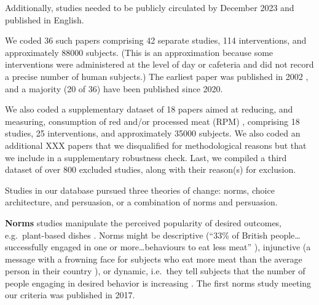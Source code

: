 \documentclass[sn-nature,pdflatex]{sn-jnl}
\begin{document}
Additionally, studies needed to be publicly circulated by December 2023
and published in English.

We coded 36 such papers
\citep{aldoh2023, allen2002, alblas2023, coker2022, griesoph2021, piester2020, sparkman2017, sparkman2020, andersson2021, kanchanachitra2020, bochmann2017, bschaden2020, cooney2016, feltz2022, haile2021, mathur2021effectiveness, peacock2017, polanco2022, sparkman2021, abrahamse2007, acharya2004, banerjee2019, berndsen2005, bertolaso2015, bianchi2022, fehrenbach2015, hatami2018, jalil2023, merrill2009, norris2014, shreedhar2021, weingarten2022, carfora2023, hennessy2016, mattson2020}
comprising 42 separate studies, 114 interventions, and approximately
88000 subjects. (This is an approximation because some interventions
were administered at the level of day or cafeteria and did not record a
precise number of human subjects.) The earliest paper was published in
2002 \citep{allen2002}, and a majority (20 of 36) have been published
since 2020.

We also coded a supplementary dataset of 18 papers aimed at reducing,
and measuring, consumption of red and/or processed meat (RPM)
\citep{carfora2017correlational, carfora2017randomised, carfora2019, carfora2019informational, delichatsios2001, dijkstra2022, emmons2005cancer, emmons2005project, jaacks2014, james2015, lee2018, perino2022, schatzkin2000, sorensen2005},
comprising 18 studies, 25 interventions, and approximately 35000
subjects. We also coded an additional XXX papers that we disqualified
for methodological reasons but that we include in a supplementary
robustness check. Last, we compiled a third dataset of over 800 excluded
studies, along with their reason(s) for exclusion.

Studies in our database pursued three theories of change: norms, choice
architecture, and persuasion, or a combination of norms and persuasion.

\textbf{Norms} studies
\citep{aldoh2023, allen2002, alblas2023, coker2022, griesoph2021, piester2020, sparkman2017, sparkman2020}
manipulate the perceived popularity of desired outcomes,
e.g.~plant-based dishes \citep{sparkman2017}. Norms might be descriptive
(``33\% of British people\ldots successfully engaged in one or
more\ldots behaviours to eat less meat'' \citep{aldoh2023}), injunctive
(a message with a frowning face for subjects who eat more meat than the
average person in their country \citep{alblas2023}), or dynamic,
i.e.~they tell subjects that the number of people engaging in desired
behavior is increasing
\citep{aldoh2023, coker2022, sparkman2017, sparkman2020}. The first
norms study meeting our criteria was published in 2017.
\end{document}
